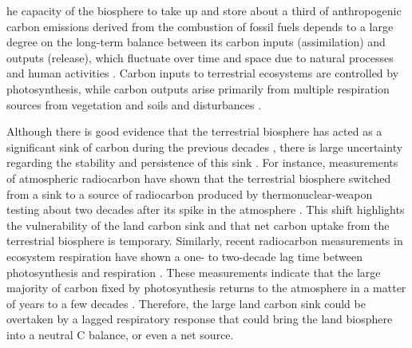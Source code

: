 \documentclass[9pt,twocolumn,twoside]{pnas-new}
\begin{document}


\maketitle
\thispagestyle{firststyle}



he capacity of the biosphere to take up and store about a third of anthropogenic carbon emissions derived from the combustion of fossil fuels \cite{Ruehr2023,Friedlingstein2025} depends to a large degree on the long-term balance between its carbon inputs (assimilation) and outputs (release), which fluctuate over time and space due to natural processes and human activities \cite{Malhi1999}. Carbon inputs to terrestrial ecosystems are controlled by photosynthesis, while carbon outputs arise primarily from multiple respiration sources from vegetation and soils and disturbances  \citep{Wisniewski1993}. 

Although there is good evidence that the terrestrial biosphere has acted as a significant sink of carbon during the previous decades \cite{Walker2021,Ruehr2023,Sitch2024}, there is large uncertainty regarding the stability and persistence of this sink \cite{Canadell2007,Fernandez-Martinez2023}. For instance, measurements of atmospheric radiocarbon have shown that the terrestrial biosphere switched from a sink to a source of radiocarbon produced by thermonuclear-weapon testing about two decades after its spike in the atmosphere \cite{Naegler2009,Levin2022}. This shift highlights the vulnerability of the land carbon sink and that net carbon uptake from the terrestrial biosphere is temporary. Similarly, recent radiocarbon measurements in ecosystem respiration have shown a one- to two-decade lag time between photosynthesis and respiration \cite{Tangarife2024JGR,Chanca2025}. These measurements indicate that the large majority of carbon fixed by photosynthesis returns to the atmosphere in a matter of years to a few decades \cite{Sierra2023PTRS}. Therefore, the large land carbon sink could be overtaken by a lagged respiratory response that could bring the land biosphere into a neutral C balance, or even a net source. 
\end{document}
